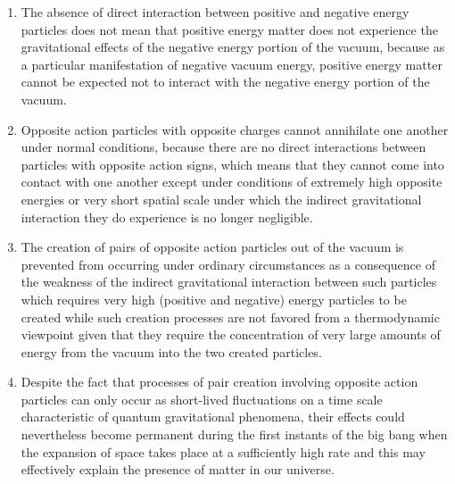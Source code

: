 \documentclass[notitlepage,12pt]{report}
\begin{document}
\begin{enumerate}
\item The absence of direct interaction between positive and negative energy particles does not mean that positive energy matter does not experience the gravitational effects of the negative energy portion of the vacuum, because as a particular manifestation of negative vacuum energy, positive energy matter cannot be expected not to interact with the negative energy portion of the vacuum.

\item Opposite action particles with opposite charges cannot annihilate one another under normal conditions, because there are no direct interactions between particles with opposite action signs, which means that they cannot come into contact with one another except under conditions of extremely high opposite energies or very short spatial scale under which the indirect gravitational interaction they do experience is no longer negligible.

\item The creation of pairs of opposite action particles out of the vacuum is prevented from occurring under ordinary circumstances as a consequence of the weakness of the indirect gravitational interaction between such particles which requires very high (positive and negative) energy particles to be created while such creation processes are not favored from a thermodynamic viewpoint given that they require the concentration of very large amounts of energy from the vacuum into the two created particles.

\item Despite the fact that processes of pair creation involving opposite action particles can only occur as short-lived fluctuations on a time scale characteristic of quantum gravitational phenomena, their effects could nevertheless become permanent during the first instants of the big bang when the expansion of space takes place at a sufficiently high rate and this may effectively explain the presence of matter in our universe.


\end{enumerate}
\end{document}
